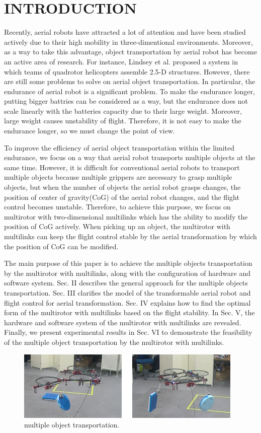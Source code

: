 \section{INTRODUCTION}
Recently, aerial robots have attracted a lot of attention and have been studied actively due to their high mobility in three-dimentional environments\cite{Kumar2012}. Moreover, as a way to take this advantage,  object transportation by aerial robot has become an active area of research. For instance, Lindsey et al.\cite{Lindsey2012} proposed a system in which teams of quadrotor helicopters assemble 2.5-D structures. However, there are still some problems to solve on aerial object transportation. In particular, the endurance of aerial robot is a significant problem. To make the endurance longer, putting bigger battries can be considered as a way, but the endurance does not scale linearly with the batteries capacity due to their large weight. Moreover, large weight causes unstability of flight. Therefore, it is not easy to make the endurance longer, so we must change the point of view. 
\par
To improve the efficiency of aerial object transportation within the limited endurance, we focus on a way that aerial robot transports multiple objects at the same time. However, it is difficult for conventional aerial robots to transport multiple objects because multiple grippers are necessary to grasp multiple objects, but when the number of objects the aerial robot grasps changes, the position of center of gravity(CoG) of the aerial robot changes, and the flight control becomes unstable. Therefore, to achieve this purpose, we focus on multirotor with two-dimensional multilinks\cite{Zhao2016} which has the ability to modify the position of CoG actively. When picking up an object, the multirotor with multilinks can keep the flight control stable by the aerial transformation by which the position of CoG can be modified. 
\par
The main purpose of this paper is to achieve the multiple objects transportation by the multirotor with multilinks, along with the configuration of hardware and software system. Sec. II describes the general approach for the multiple objects transportation. Sec. III clarifies the model of the transformable aerial robot and flight control for aerial transformation.  Sec. IV explains how to find the optimal form of the multirotor with multilinks based on the flight stability. In Sec. V, the hardware and software system of the multirotor with multilinks are revealed. Finally, we present experimental results in Sec. VI to demonstrate the feasibility of the multiple object transportation by the multirotor with multilinks. 
\begin{figure}[t]
  \begin{center}
    \includegraphics[width=1.0\columnwidth]{figs/object_transportation.png}
  \end{center}
  \caption{multiple object transportation.}
  \label{figure:system}
\end{figure}
